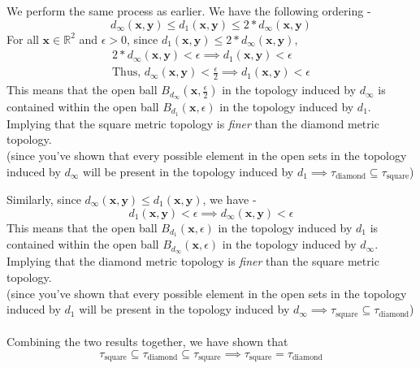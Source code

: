 \begin{frame}
    We perform the same process as earlier. We have the following ordering -
    \begin{equation*}
        d_\infty(\boldsymbol{x}, \boldsymbol{y}) \leq d_1(\boldsymbol{x}, \boldsymbol{y}) \leq 2*d_\infty(\boldsymbol{x}, \boldsymbol{y})
    \end{equation*}
    For all $\boldsymbol{x} \in \mathbb{R}^2$ and $\epsilon > 0$, since $d_1(\boldsymbol{x}, \boldsymbol{y}) \leq 2*d_\infty(\boldsymbol{x}, \boldsymbol{y})$,
    \begin{gather*}
         2*d_\infty(\boldsymbol{x}, \boldsymbol{y}) < \epsilon \implies d_1(\boldsymbol{x}, \boldsymbol{y}) < \epsilon \\
         \text{Thus, }d_\infty(\boldsymbol{x}, \boldsymbol{y}) < \frac{\epsilon}{2} \implies d_1(\boldsymbol{x}, \boldsymbol{y}) < \epsilon
    \end{gather*}
    This means that the open ball $B_{d_\infty}\left(\boldsymbol{x}, \frac{\epsilon}{2}\right)$ in the topology induced by $d_{\infty}$ is contained within the open ball $B_{d_1}\left(\boldsymbol{x}, \epsilon\right)$ in the topology induced by $d_1$. Implying that the square metric topology is \textit{finer} than the diamond metric topology. \\
    (since you've shown that every possible element in the open sets in the topology induced by $d_\infty$ will be present in the topology induced by $d_1 \implies \tau_{\text{diamond}} \subseteq \tau_{\text{square}}$)
\end{frame}

\begin{frame}
    Similarly, since $d_\infty(\boldsymbol{x}, \boldsymbol{y}) \leq d_1(\boldsymbol{x}, \boldsymbol{y})$, we have -
    \begin{equation*}
        d_1(\boldsymbol{x}, \boldsymbol{y}) < \epsilon \implies d_\infty(\boldsymbol{x}, \boldsymbol{y}) < \epsilon
    \end{equation*}
    This means that the open ball $B_{d_1}\left(\boldsymbol{x}, \epsilon\right)$ in the topology induced by $d_1$ is contained within the open ball $B_{d_\infty}\left(\boldsymbol{x}, \epsilon\right)$ in the topology induced by $d_\infty$. Implying that the diamond metric topology is \textit{finer} than the square metric topology. \\
    (since you've shown that every possible element in the open sets in the topology induced by $d_1$ will be present in the topology induced by $d_\infty \implies \tau_{\text{square}} \subseteq \tau_{\text{diamond}}$) \\\\
    Combining the two results together, we have shown that 
    \begin{equation*}
        \tau_{\text{square}} \subseteq \tau_{\text{diamond}} \subseteq \tau_{\text{square}} \implies \tau_{\text{square}} = \tau_{\text{diamond}}
    \end{equation*}
\end{frame}

